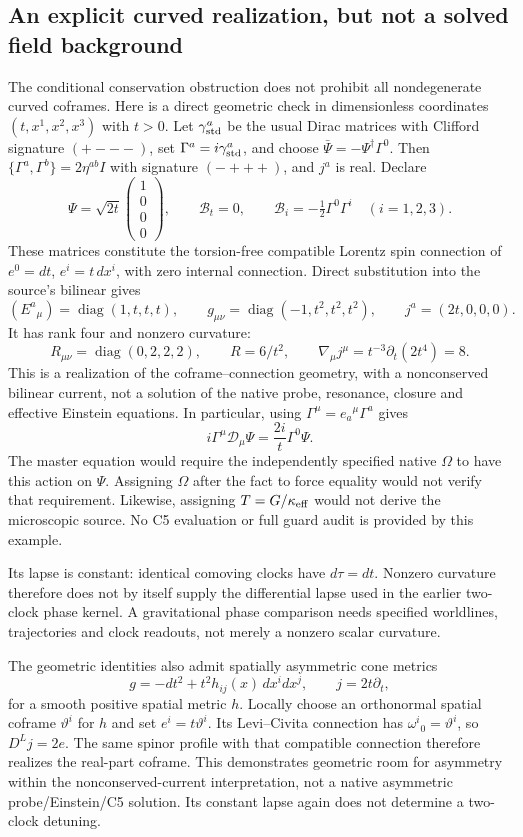 \documentclass[11pt,a4paper]{article}
\begin{document}
\subsection{An explicit curved realization, but not a solved field background}
The conditional conservation obstruction does not prohibit all
nondegenerate curved coframes. Here is a direct geometric check in
dimensionless coordinates $(t,x^1,x^2,x^3)$ with $t>0$.
Let $\gamma_{\rm std}^a$ be the usual Dirac matrices with Clifford
signature $(+---)$, set $\Gamma^a=i\gamma_{\rm std}^a$, and choose
$\bar\Psi=-\Psi^\dagger\Gamma^0$. Then $\{\Gamma^a,\Gamma^b\}
=2\eta^{ab}I$ with signature $(-+++)$, and $j^a$ is real. Declare
\[
 \Psi=\sqrt{2t}\begin{pmatrix}1\\0\\0\\0\end{pmatrix},\qquad
 \mathcal B_t=0,\qquad
 \mathcal B_i=-\tfrac12\Gamma^0\Gamma^i\quad(i=1,2,3).
\]
These matrices constitute the torsion-free compatible Lorentz spin
connection of $e^0=dt$, $e^i=t\,dx^i$, with zero internal connection.
Direct substitution into the source's bilinear gives
\[
 (E^a{}_{\mu})=\operatorname{diag}(1,t,t,t),\qquad
 g_{\mu\nu}=\operatorname{diag}(-1,t^2,t^2,t^2),\qquad
 j^a=(2t,0,0,0).
\]
It has rank four and nonzero curvature:
\[
 R_{\mu\nu}=\operatorname{diag}(0,2,2,2),\qquad
 R=6/t^2,\qquad
 \nabla_\mu j^\mu=t^{-3}\partial_t(2t^4)=8.
\]
This is a realization of the coframe--connection geometry, with a
nonconserved bilinear current, not a solution of the native probe,
resonance, closure and effective Einstein equations. In particular,
using $\Gamma^\mu=e_a{}^\mu\Gamma^a$ gives
\[
 i\Gamma^\mu\mathcal D_\mu\Psi
 =\frac{2i}{t}\Gamma^0\Psi.
\]
The master equation would require the independently specified native
$\Omega$ to have this action on $\Psi$. Assigning $\Omega$ after the
fact to force equality would not verify that requirement. Likewise,
assigning $T=G/\kappa_{\rm eff}$ would not derive the microscopic source.
No C5 evaluation or full guard audit is provided by this example.

Its lapse is constant: identical comoving clocks have $d\tau=dt$.
Nonzero curvature therefore does not by itself supply the differential
lapse used in the earlier two-clock phase kernel. A gravitational phase
comparison needs specified worldlines, trajectories and clock readouts,
not merely a nonzero scalar curvature.

The geometric identities also admit spatially asymmetric cone metrics
\[
 g=-dt^2+t^2h_{ij}(x)\,dx^i dx^j,\qquad j=2t\partial_t,
\]
for a smooth positive spatial metric $h$. Locally choose an orthonormal
spatial coframe $\vartheta^i$ for $h$ and set $e^i=t\vartheta^i$.
Its Levi--Civita connection has $\omega^i{}_0=\vartheta^i$, so
$D^Lj=2e$. The same spinor profile with that compatible connection
therefore realizes the real-part coframe. This demonstrates geometric
room for asymmetry within the nonconserved-current interpretation,
not a native asymmetric probe/Einstein/C5 solution. Its constant lapse
again does not determine a two-clock detuning.
\end{document}
